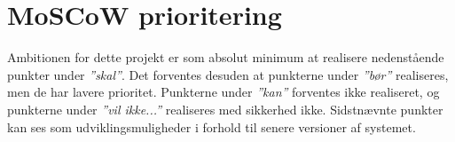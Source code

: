 
\section*{MoSCoW prioritering} \label{sec:moscow_prioritering}

Ambitionen for dette projekt er som absolut minimum at realisere nedenstående punkter under \textit{''skal''}. 
Det forventes desuden at punkterne under \textit{''bør''} realiseres, men de har lavere prioritet.
Punkterne under \textit{''kan''} forventes ikke realiseret, og punkterne under \textit{''vil ikke...''} realiseres med sikkerhed ikke. 
Sidstnævnte punkter kan ses som udviklingsmuligheder i forhold til senere versioner af systemet. 

